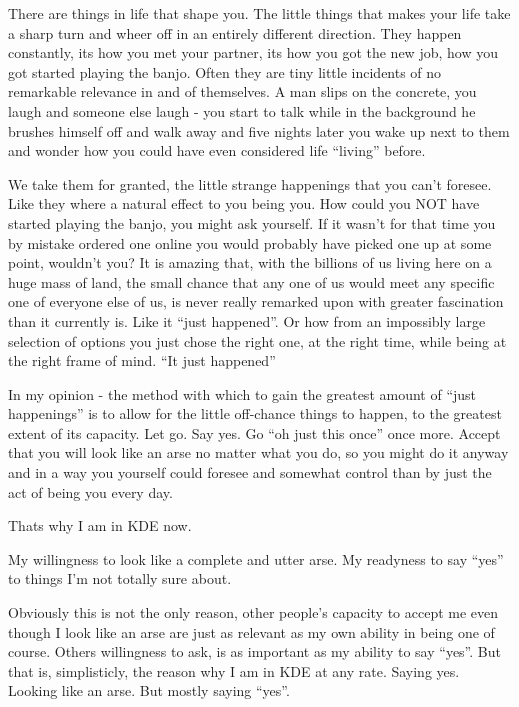 

\noindent{}There are things in life that shape you. The little things that makes your life take a sharp turn and wheer off in an entirely different direction. 
They happen constantly, its how you met your partner, its how you got the new job, how you got started playing the banjo. Often they are tiny little incidents of no remarkable relevance in and of themselves. A man slips on the concrete, you laugh and someone else laugh - you start to talk while in the background he brushes himself off and walk away and five nights later you wake up next to them and wonder how you could have even considered life “living” before.

We take them for granted, the little strange happenings that you can’t foresee. Like they where a natural effect to you being you. How could you NOT have started playing the banjo, you might ask yourself. If it wasn’t for that time you by mistake ordered one online you would probably have picked one up at some point, wouldn’t you? 
It is amazing that, with the billions of us living here on a huge mass of land, the small chance that any one of us would meet any specific one of everyone else of us, is never really remarked upon with greater fascination than it currently is. Like it “just happened”.  Or how from an impossibly large selection of options you just chose the right one, at the right time, while being at the right frame of mind. “It just happened”

In my opinion - the method with which to gain the greatest amount of “just happenings” is to allow for the little off-chance things to happen, to the greatest extent of its capacity. Let go. Say yes. Go “oh just this once” once more. Accept that you will look like an arse no matter what you do, so you might do it anyway and in a way you yourself could foresee and somewhat control than by just the act of being you every day. 

Thats why I am in KDE now.

My willingness to look like a complete and utter arse. My readyness to say “yes” to things I’m not totally sure about.

Obviously this is not the only reason, other people's capacity to accept me even though I look like an arse are just as relevant as my own ability in being one of course. Others willingness to ask, is as important as my ability to say “yes”. But that is, simplisticly, the reason why I am in KDE at any rate. Saying yes. Looking like an arse. But mostly saying “yes”.


